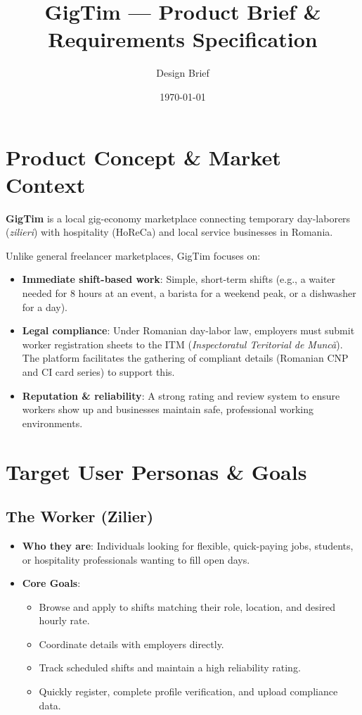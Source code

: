 \documentclass{article}
\title{GigTim --- Product Brief \& Requirements Specification}
\author{Design Brief}
\date{\today}
\begin{document}
\maketitle

\section{Product Concept \& Market Context}
\textbf{GigTim} is a local gig-economy marketplace connecting temporary day-laborers (\textit{zilieri}) with hospitality (HoReCa) and local service businesses in Romania. 

Unlike general freelancer marketplaces, GigTim focuses on:
\begin{itemize}
    \item \textbf{Immediate shift-based work}: Simple, short-term shifts (e.g., a waiter needed for 8 hours at an event, a barista for a weekend peak, or a dishwasher for a day).
    \item \textbf{Legal compliance}: Under Romanian day-labor law, employers must submit worker registration sheets to the ITM (\textit{Inspectoratul Teritorial de Muncă}). The platform facilitates the gathering of compliant details (Romanian CNP and CI card series) to support this.
    \item \textbf{Reputation \& reliability}: A strong rating and review system to ensure workers show up and businesses maintain safe, professional working environments.
\end{itemize}

\section{Target User Personas \& Goals}

\subsection{The Worker (Zilier)}
\begin{itemize}
    \item \textbf{Who they are}: Individuals looking for flexible, quick-paying jobs, students, or hospitality professionals wanting to fill open days.
    \item \textbf{Core Goals}:
    \begin{itemize}
        \item Browse and apply to shifts matching their role, location, and desired hourly rate.
        \item Coordinate details with employers directly.
        \item Track scheduled shifts and maintain a high reliability rating.
        \item Quickly register, complete profile verification, and upload compliance data.
    \end{itemize}
\end{itemize}
\end{document}
